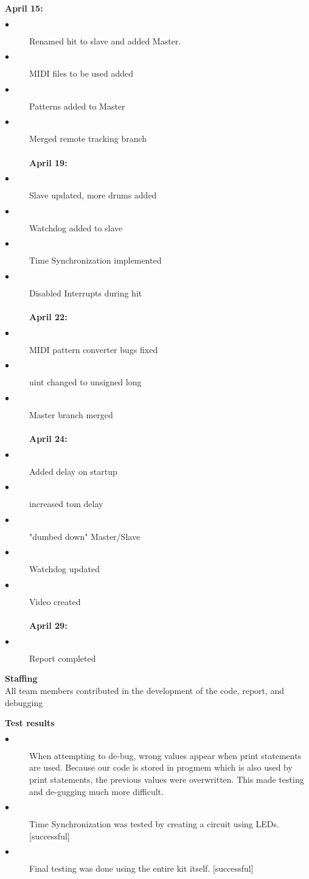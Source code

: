 \documentclass[]{report}
\begin{document}
\textbf{April 15:} 
	\begin{description}
	\item[$\bullet$] Renamed hit to slave and added Master.
	\item[$\bullet$] MIDI files to be used added
	\item[$\bullet$] Patterns added to Master
	\item[$\bullet$] Merged remote tracking branch\\\\
\textbf{April 19:}
	\item[$\bullet$] Slave updated, more drums added
	\item[$\bullet$] Watchdog added to slave
	\item[$\bullet$] Time Synchronization implemented
	\item[$\bullet$] Disabled Interrupts during hit\\\\
\textbf{April 22:}
	\item[$\bullet$] MIDI pattern converter bugs fixed
	\item[$\bullet$] uint changed to unsigned long
	\item[$\bullet$] Master branch merged \\\\
\textbf{April 24:}
	\item[$\bullet$] Added delay on startup
	\item[$\bullet$] increased tom delay
	\item[$\bullet$] "dumbed down" Master/Slave
	\item[$\bullet$] Watchdog updated
	\item[$\bullet$] Video created\\\\
\textbf{April 29:}
	\item[$\bullet$] Report completed
	\end{description}
\textbf{Staffing}\\
All team members contributed in the development of the code, report, and debugging
	
\begin{center} \textbf{Test results} \end{center}
\begin{description}
	\item[$\bullet$] When attempting to de-bug, wrong values appear when print statements are used. Because our code is stored in progmem which is also used by print statements, the previous values were overwritten. This made testing and de-gugging much more difficult.
	\item[$\bullet$] Time Synchronization was tested by creating a circuit using LEDs. [successful]
	\item[$\bullet$] Final testing was done using the entire kit itself. [successful]
\end{description}
\end{document}
